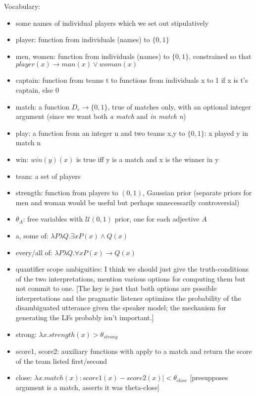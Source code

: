 \documentclass[12pt]{article}
\begin{document}
\noindent Vocabulary:
\begin{itemize}
\item some names of individual players which we set out stipulatively
\item player: function from individuals (names) to $\{0,1\}$
\item men, women: function from individuals (names) to $\{0,1\}$, constrained so that $\mathit{player}(x) \rightarrow \mathit{man}(x) \vee \mathit{woman}(x)$
\item captain: function from teams t to functions from individuals x to 1 if x is t's captain, else 0
\item match: a function $D_e \rightarrow \{0,1\}$, true of matches only, with an optional integer argument (since we want both \emph{a match} and \emph{in match n}) 
\item play: a function from an integer n and two teams x,y to $\{0,1\}$: x played y in match n
\item win: $\mathit{win}(y)(x)$ is true iff y is a match and x is the winner in y
\item team: a set of players
\item strength: function from players to $(0,1)$, Gaussian prior (separate priors for men and woman would be useful but perhaps unnecessarily controversial)
\item $\theta_A$: free variables with $\mathcal{U}(0,1)$ prior, one for each adjective $A$
\item a, some of: $\lambda P \lambda Q . \exists x P(x) \wedge Q(x)$
\item every/all of: $\lambda P \lambda Q . \forall x P(x) \rightarrow Q(x)$
\item quantifier scope ambiguities: I think we should just give the truth-conditions of the two interpretations, mention various options for computing them but not commit to one. [The key is just that both options are possible interpretations and the pragmatic listener optimizes the probability of the disambiguated utterance given the speaker model; the mechanism for generating the LFs probably isn't important.]
\item strong: $\lambda x . \mathit{strength}(x) > \theta_{\mathit{strong}}$
\item score1, score2: auxiliary functions with apply to a match and return the score of the team listed first/second 
\item close: $\lambda x . \mathit{match}(x): \mathit{score1}(x) - \mathit{score2}(x)| < \theta_{\mathit{close}}$ [presupposes argument is a match, asserts it was theta-close]

\end{itemize}
\end{document}
